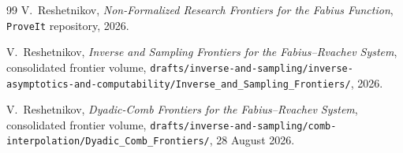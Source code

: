 \documentclass[11pt,oneside]{article}
\numberwithin{equation}{section}
\theoremstyle{definition}
\theoremstyle{remark}
\begin{document}
\begin{thebibliography}{99}
V.~Reshetnikov,
\newblock \emph{Non-Formalized Research Frontiers for the Fabius
Function},
\newblock \texttt{ProveIt} repository, 2026.

V.~Reshetnikov,
\newblock \emph{Inverse and Sampling Frontiers for the
Fabius--Rvachev System},
\newblock consolidated frontier volume,
\nolinkurl{drafts/inverse-and-sampling/inverse-asymptotics-and-computability/Inverse_and_Sampling_Frontiers/},
2026.

V.~Reshetnikov,
\newblock \emph{Dyadic-Comb Frontiers for the Fabius--Rvachev
System},
\newblock consolidated frontier volume,
\nolinkurl{drafts/inverse-and-sampling/comb-interpolation/Dyadic_Comb_Frontiers/},
28 August 2026.

\end{thebibliography}
\end{document}
